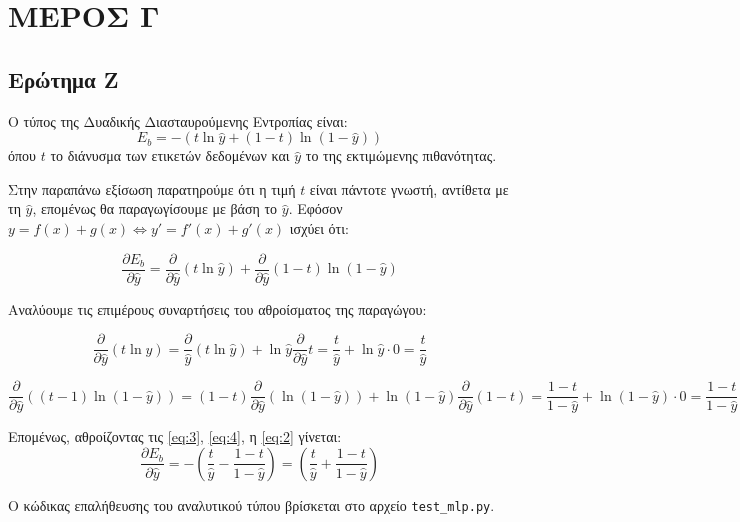 \documentclass{article}
\newcommand{\code}{\texttt}
\begin{document}
\section{ΜΕΡΟΣ Γ}


\subsection{Ερώτημα Ζ}

Ο τύπος της Δυαδικής Διασταυρούμενης Εντροπίας είναι:
 \begin{equation}
 	\label{eq:1}
 	E_{b} = -(t \ln \hat{y} + (1-t) \ln(1-\hat{y}))
 \end{equation}
όπου $t$ το διάνυσμα των ετικετών δεδομένων και $\hat{y}$ το της εκτιμώμενης πιθανότητας.

Στην παραπάνω εξίσωση παρατηρούμε ότι η τιμή $t$ είναι πάντοτε γνωστή, αντίθετα με τη $\hat{y}$, επομένως θα παραγωγίσουμε με βάση το $\hat{y}$. Εφόσον $y = f(x) + g(x) \iff y' = f'(x) + g'(x)$ ισχύει ότι:

\begin{equation}
	\label{eq:2}
	 \frac{\partial E_b}{\partial \hat{y}} = \frac{\partial}{\partial \hat{y}} (t\ln \hat{y}) + \frac{\partial}{\partial \hat{y}} (1-t) \ln (1-\hat{y})
\end{equation}

Αναλύουμε τις επιμέρους συναρτήσεις του αθροίσματος της παραγώγου:

\begin{equation}
	\label{eq:3}
	\frac{\partial}{\partial \hat{y}} (t \ln\hat{y}) = \frac{\partial }{\hat{y}} (t\ln\hat{y}) + \ln\hat{y} \frac{\partial}{\partial \hat{y}}t = \frac{t}{\hat{y}} + \ln \hat{y} \cdot 0 = \frac{t}{\hat{y}}
\end{equation}

\begin{equation}
	\label{eq:4}
	\frac{\partial}{\partial \hat{y}} ((t-1) \ln(1-\hat{y})) = (1-t)\frac{\partial}{\partial\hat{y}} (\ln(1-\hat{y})) + \ln(1-\hat{y}) \frac{\partial}{\partial \hat{y}}(1-t) = \frac{1-t}{1-\hat{y}} + \ln(1-\hat{y}) \cdot 0 =\frac{1-t}{1-\hat{y}}
\end{equation}


Επομένως, αθροίζοντας τις \ref{eq:3}, \ref{eq:4}, η \ref{eq:2} γίνεται:
\begin{equation}
	\frac{\partial E_b}{\partial \hat{y}} = - (\frac{t}{\hat{y}} - \frac{1-t}{1-\hat{y}}) = (\frac{t}{\hat{y}} + \frac{1-t}{1 - \hat{y}})
\end{equation}

Ο κώδικας επαλήθευσης του αναλυτικού τύπου βρίσκεται στο αρχείο \code{test\_mlp.py}.

\printbibliography
\end{document}
